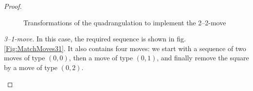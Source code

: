\documentclass{amsart}
\begin{document}
\begin{proof}
\begin{figure}[ht]
\begin{center}
        \end{center}
        \caption{\label{Fig:MatchedMoves22}Transformations of the quadrangulation to implement the 2--2-move}
    \end{figure}

    \emph{3--1-move.} In this case, the required sequence is shown in fig. \ref{Fig:MatchMoves31}. It also contains four moves: we start with a sequence of two moves of type $(0, 0)$, then a move of type $(0, 1)$, and finally remove the square by a move of type $(0, 2)$.

    \begin{figure}[ht]
        \begin{center}
            \begin{tikzpicture}[scale=1.5]



\end{tikzpicture}
\end{center}
\end{figure}
\end{proof}
\end{document}
